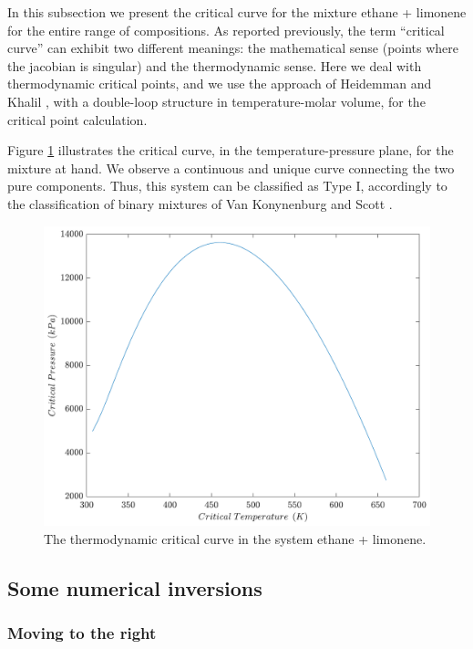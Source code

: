 \documentclass{article}
\theoremstyle{definition}
\theoremstyle{remark}
\begin{document}
In this subsection we present the critical curve for the mixture 
ethane + limonene for the entire range of compositions. As reported 
previously, the term ``critical curve'' can exhibit two different 
meanings: the mathematical sense (points where the jacobian is 
singular) and the thermodynamic sense. Here we  deal
 with thermodynamic critical points, and  we use the approach of Heidemman and Khalil \cite{heidemman}, with a double-loop structure in temperature-molar volume, for the critical point calculation.

Figure \ref{fig:critical_thermo} illustrates the critical curve, in the temperature-pressure plane, for the mixture at hand. We observe
 a continuous and unique curve connecting the two pure components. Thus, this system can be classified as Type I, accordingly to the classification of binary mixtures of Van Konynenburg and Scott \cite{classif}.

\begin{figure}
	\begin{center}
		\includegraphics[scale=0.50]{temperatura_pressao.pdf}
		\caption{The thermodynamic critical curve in the system ethane + limonene.}\label{fig:critical_thermo}
	\end{center}
\end{figure}

\subsection{Some numerical inversions}

\subsubsection{Moving to the right}
\end{document}
